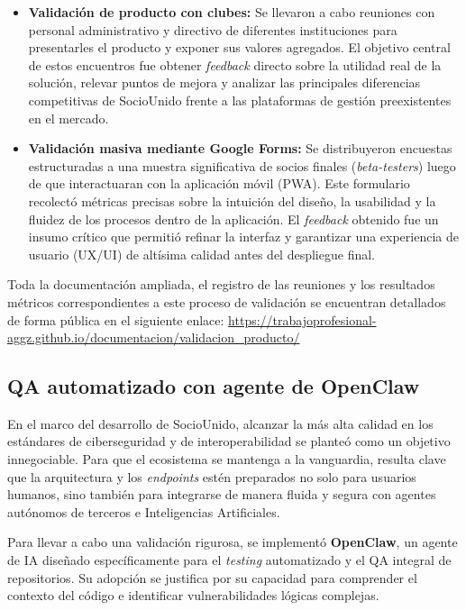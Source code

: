 \begin{itemize}
    \item \textbf{Validación de producto con clubes:} Se llevaron a cabo reuniones con personal administrativo y directivo de diferentes instituciones para presentarles el producto y exponer sus valores agregados. El objetivo central de estos encuentros fue obtener \textit{feedback} directo sobre la utilidad real de la solución, relevar puntos de mejora y analizar las principales diferencias competitivas de SocioUnido frente a las plataformas de gestión preexistentes en el mercado.
    \item \textbf{Validación masiva mediante Google Forms:} Se distribuyeron encuestas estructuradas a una muestra significativa de socios finales (\textit{beta-testers}) luego de que interactuaran con la aplicación móvil (PWA). Este formulario recolectó métricas precisas sobre la intuición del diseño, la usabilidad y la fluidez de los procesos dentro de la aplicación. El \textit{feedback} obtenido fue un insumo crítico que permitió refinar la interfaz y garantizar una experiencia de usuario (UX/UI) de altísima calidad antes del despliegue final.
\end{itemize}

Toda la documentación ampliada, el registro de las reuniones y los resultados métricos correspondientes a este proceso de validación se encuentran detallados de forma pública en el siguiente enlace: \url{https://trabajoprofesional-aggz.github.io/documentacion/validacion_producto/}

\subsection{QA automatizado con agente de OpenClaw}

En el marco del desarrollo de SocioUnido, alcanzar la más alta calidad en los estándares de ciberseguridad y de interoperabilidad se planteó como un objetivo innegociable. Para que el ecosistema se mantenga a la vanguardia, resulta clave que la arquitectura y los \textit{endpoints} estén preparados no solo para usuarios humanos, sino también para integrarse de manera fluida y segura con agentes autónomos de terceros e Inteligencias Artificiales.

Para llevar a cabo una validación rigurosa, se implementó \textbf{OpenClaw}, un agente de IA diseñado específicamente para el \textit{testing} automatizado y el QA integral de repositorios. Su adopción se justifica por su capacidad para comprender el contexto del código e identificar vulnerabilidades lógicas complejas.

